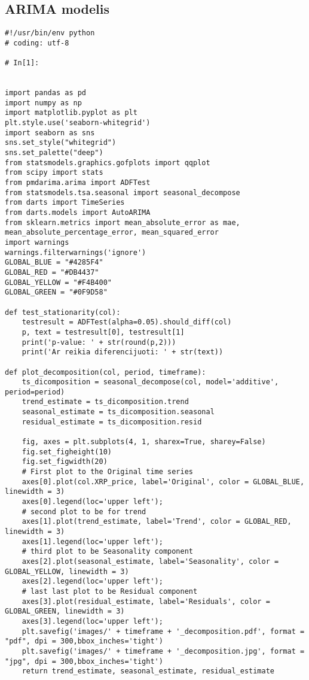 \documentclass[12pt,a4paper]{article}
\begin{document}
\subsection{ARIMA modelis}
\begin{lstlisting}[breaklines]
#!/usr/bin/env python
# coding: utf-8

# In[1]:


import pandas as pd
import numpy as np
import matplotlib.pyplot as plt
plt.style.use('seaborn-whitegrid')
import seaborn as sns
sns.set_style("whitegrid")
sns.set_palette("deep")
from statsmodels.graphics.gofplots import qqplot
from scipy import stats
from pmdarima.arima import ADFTest
from statsmodels.tsa.seasonal import seasonal_decompose
from darts import TimeSeries
from darts.models import AutoARIMA
from sklearn.metrics import mean_absolute_error as mae, mean_absolute_percentage_error, mean_squared_error
import warnings
warnings.filterwarnings('ignore')
GLOBAL_BLUE = "#4285F4"
GLOBAL_RED = "#DB4437"
GLOBAL_YELLOW = "#F4B400"
GLOBAL_GREEN = "#0F9D58"

def test_stationarity(col):
    testresult = ADFTest(alpha=0.05).should_diff(col)
    p, text = testresult[0], testresult[1]
    print('p-value: ' + str(round(p,2)))
    print('Ar reikia diferencijuoti: ' + str(text))

def plot_decomposition(col, period, timeframe):
    ts_dicomposition = seasonal_decompose(col, model='additive', period=period)
    trend_estimate = ts_dicomposition.trend
    seasonal_estimate = ts_dicomposition.seasonal
    residual_estimate = ts_dicomposition.resid

    fig, axes = plt.subplots(4, 1, sharex=True, sharey=False)
    fig.set_figheight(10)
    fig.set_figwidth(20)
    # First plot to the Original time series
    axes[0].plot(col.XRP_price, label='Original', color = GLOBAL_BLUE, linewidth = 3) 
    axes[0].legend(loc='upper left');
    # second plot to be for trend
    axes[1].plot(trend_estimate, label='Trend', color = GLOBAL_RED, linewidth = 3)
    axes[1].legend(loc='upper left');
    # third plot to be Seasonality component
    axes[2].plot(seasonal_estimate, label='Seasonality', color = GLOBAL_YELLOW, linewidth = 3)
    axes[2].legend(loc='upper left');
    # last last plot to be Residual component
    axes[3].plot(residual_estimate, label='Residuals', color = GLOBAL_GREEN, linewidth = 3)
    axes[3].legend(loc='upper left');
    plt.savefig('images/' + timeframe + '_decomposition.pdf', format = "pdf", dpi = 300,bbox_inches='tight')
    plt.savefig('images/' + timeframe + '_decomposition.jpg', format = "jpg", dpi = 300,bbox_inches='tight')
    return trend_estimate, seasonal_estimate, residual_estimate


\end{lstlisting}
\end{document}
